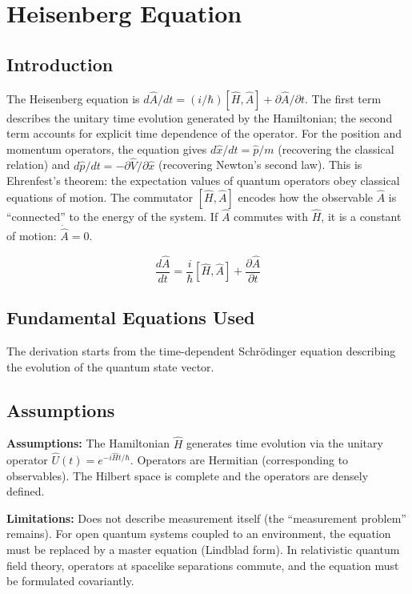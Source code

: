 \chapter{Heisenberg Equation}

\section*{Introduction}

The Heisenberg equation is $d\hat{A}/dt = (i/\hbar)[\hat{H}, \hat{A}] + \partial\hat{A}/\partial t$. The first term describes the unitary time evolution generated by the Hamiltonian; the second term accounts for explicit time dependence of the operator. For the position and momentum operators, the equation gives $d\hat{x}/dt = \hat{p}/m$ (recovering the classical relation) and $d\hat{p}/dt = -\partial\hat{V}/\partial\hat{x}$ (recovering Newton's second law). This is Ehrenfest's theorem: the expectation values of quantum operators obey classical equations of motion. The commutator $[\hat{H}, \hat{A}]$ encodes how the observable $\hat{A}$ is ``connected'' to the energy of the system. If $\hat{A}$ commutes with $\hat{H}$, it is a constant of motion: $\dot{\hat{A}} = 0$.


\[
\frac{d\hat{A}}{dt}=\frac{i}{\hbar}[\hat{H},\hat{A}]+\frac{\partial\hat{A}}{\partial t}
\]

\section*{Fundamental Equations Used}

The derivation starts from the time-dependent Schr\"odinger equation describing the evolution of the quantum state vector.

\section*{Assumptions}

\textbf{Assumptions:} The Hamiltonian $\hat{H}$ generates time evolution via the unitary operator $\hat{U}(t) = e^{-i\hat{H}t/\hbar}$. Operators are Hermitian (corresponding to observables). The Hilbert space is complete and the operators are densely defined.


\textbf{Limitations:} Does not describe measurement itself (the ``measurement problem'' remains). For open quantum systems coupled to an environment, the equation must be replaced by a master equation (Lindblad form). In relativistic quantum field theory, operators at spacelike separations commute, and the equation must be formulated covariantly.


